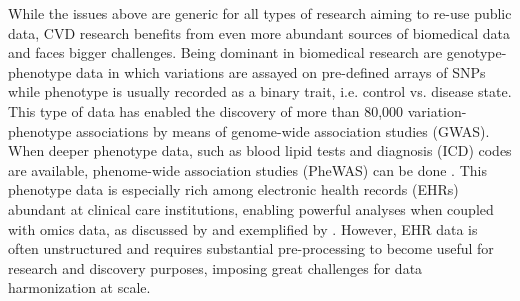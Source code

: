 \documentclass[letter]{bioinfo}
\begin{document}
    While the issues above are generic for all types of research aiming to re-use public data, CVD research benefits from even more abundant sources of biomedical data and faces bigger challenges. Being dominant in biomedical research are genotype-phenotype data in which variations are assayed on pre-defined arrays of SNPs while phenotype is usually recorded as a binary trait, i.e. control vs. disease state. This type of data has enabled the discovery of more than 80,000 variation-phenotype associations by means of genome-wide association studies (GWAS). When deeper phenotype data, such as blood lipid tests and diagnosis (ICD) codes are available, phenome-wide association studies (PheWAS) can be done \citep{Denny:2013:Systematic}. This phenotype data is especially rich among electronic health records (EHRs) abundant at clinical care institutions, enabling powerful analyses when coupled with omics data, as discussed by \cite{Denaxas:2015:Big, Wu:2017:Omic} and exemplified by \cite{Dewey:2016:Distribution,Li:2018:Decoding}. However, EHR data is often unstructured and requires substantial pre-processing to become useful for research and discovery purposes, imposing great challenges for data harmonization at scale.
    
\end{document}
